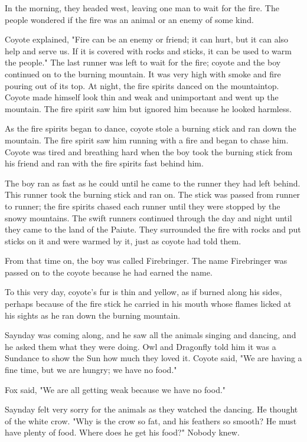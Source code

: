 In the morning, they headed west, leaving one man to wait for the fire. The people wondered if the fire was an animal or an enemy of some kind.

Coyote explained, "Fire can be an enemy or friend; it can hurt, but it can also help and serve us. If it is covered with rocks and sticks, it can be used to warm the people." The last runner was left to wait for the fire; coyote and the boy continued on to the burning mountain. It was very high with smoke and fire pouring out of its top. At night, the fire spirits danced on the mountaintop. Coyote made himself look thin and weak and unimportant and went up the mountain. The fire spirit saw him but ignored him because he looked harmless.

As the fire spirits began to dance, coyote stole a burning stick and ran down the mountain. The fire spirit saw him running with a fire and began to chase him. Coyote was tired and breathing hard when the boy took the burning stick from his friend and ran with the fire spirits fast behind him.

The boy ran as fast as he could until he came to the runner they had left behind. This runner took the burning stick and ran on. The stick was passed from runner to runner; the fire spirits chased each runner until they were stopped by the snowy mountains. The swift runners continued through the day and night until they came to the land of the Paiute. They surrounded the fire with rocks and put sticks on it and were warmed by it, just as coyote had told them.

From that time on, the boy was called Firebringer. The name Firebringer was passed on to the coyote because he had earned the name.

To this very day, coyote's fur is thin and yellow, as if burned along his sides, perhaps because of the fire stick he carried in his mouth whose flames licked at his sights as he ran down the burning mountain.

Saynday was coming along, and he saw all the animals singing and dancing, and he asked them what they were doing. Owl and Dragonfly told him it was a Sundance to show the Sun how much they loved it. Coyote said, "We are having a fine time, but we are hungry; we have no food."

Fox said, "We are all getting weak because we have no food."

Saynday felt very sorry for the animals as they watched the dancing. He thought of the white crow. "Why is the crow so fat, and his feathers so smooth? He must have plenty of food. Where does he get his food?" Nobody knew.


